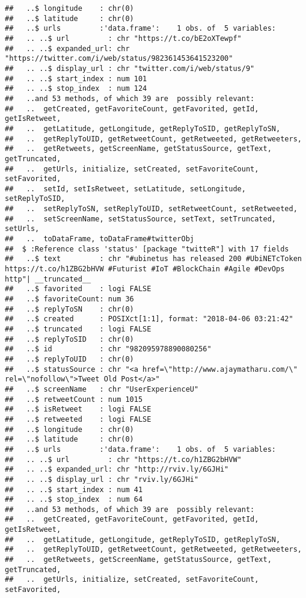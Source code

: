 \documentclass[]{article}
\begin{document}
\begin{verbatim}
##   ..$ longitude    : chr(0) 
##   ..$ latitude     : chr(0) 
##   ..$ urls         :'data.frame':    1 obs. of  5 variables:
##   .. ..$ url         : chr "https://t.co/bE2oXTewpf"
##   .. ..$ expanded_url: chr "https://twitter.com/i/web/status/982361453641523200"
##   .. ..$ display_url : chr "twitter.com/i/web/status/9"
##   .. ..$ start_index : num 101
##   .. ..$ stop_index  : num 124
##   ..and 53 methods, of which 39 are  possibly relevant:
##   ..  getCreated, getFavoriteCount, getFavorited, getId, getIsRetweet,
##   ..  getLatitude, getLongitude, getReplyToSID, getReplyToSN,
##   ..  getReplyToUID, getRetweetCount, getRetweeted, getRetweeters,
##   ..  getRetweets, getScreenName, getStatusSource, getText, getTruncated,
##   ..  getUrls, initialize, setCreated, setFavoriteCount, setFavorited,
##   ..  setId, setIsRetweet, setLatitude, setLongitude, setReplyToSID,
##   ..  setReplyToSN, setReplyToUID, setRetweetCount, setRetweeted,
##   ..  setScreenName, setStatusSource, setText, setTruncated, setUrls,
##   ..  toDataFrame, toDataFrame#twitterObj
##  $ :Reference class 'status' [package "twitteR"] with 17 fields
##   ..$ text         : chr "#ubinetus has released 200 #UbiNETcToken https://t.co/h1ZBG2bHVW #Futurist #IoT #BlockChain #Agile #DevOps http"| __truncated__
##   ..$ favorited    : logi FALSE
##   ..$ favoriteCount: num 36
##   ..$ replyToSN    : chr(0) 
##   ..$ created      : POSIXct[1:1], format: "2018-04-06 03:21:42"
##   ..$ truncated    : logi FALSE
##   ..$ replyToSID   : chr(0) 
##   ..$ id           : chr "982095978890080256"
##   ..$ replyToUID   : chr(0) 
##   ..$ statusSource : chr "<a href=\"http://www.ajaymatharu.com/\" rel=\"nofollow\">Tweet Old Post</a>"
##   ..$ screenName   : chr "UserExperienceU"
##   ..$ retweetCount : num 1015
##   ..$ isRetweet    : logi FALSE
##   ..$ retweeted    : logi FALSE
##   ..$ longitude    : chr(0) 
##   ..$ latitude     : chr(0) 
##   ..$ urls         :'data.frame':    1 obs. of  5 variables:
##   .. ..$ url         : chr "https://t.co/h1ZBG2bHVW"
##   .. ..$ expanded_url: chr "http://rviv.ly/6GJHi"
##   .. ..$ display_url : chr "rviv.ly/6GJHi"
##   .. ..$ start_index : num 41
##   .. ..$ stop_index  : num 64
##   ..and 53 methods, of which 39 are  possibly relevant:
##   ..  getCreated, getFavoriteCount, getFavorited, getId, getIsRetweet,
##   ..  getLatitude, getLongitude, getReplyToSID, getReplyToSN,
##   ..  getReplyToUID, getRetweetCount, getRetweeted, getRetweeters,
##   ..  getRetweets, getScreenName, getStatusSource, getText, getTruncated,
##   ..  getUrls, initialize, setCreated, setFavoriteCount, setFavorited,

\end{verbatim}
\end{document}
